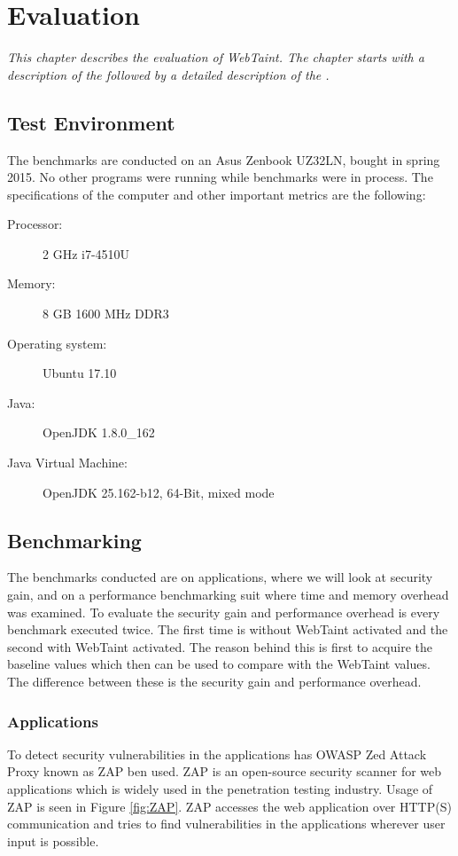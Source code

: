 \chapter{Evaluation}
\label{Evaluation}
\textit{This chapter describes the evaluation of WebTaint. The chapter starts with a description of the \textit{} followed by a detailed description of the \textit{}.}



\section{Test Environment}
\label{TestEnvironment}
The benchmarks are conducted on an Asus Zenbook UZ32LN, bought in spring 2015. No other programs were running while benchmarks were in process. The specifications of the computer and other important metrics are the following:

\begin{description}
    \item [Processor:] 2 GHz i7-4510U
    \item [Memory:] 8 GB 1600 MHz DDR3
    \item [Operating system:] Ubuntu 17.10
    \item [Java:] OpenJDK 1.8.0\_162
    \item [Java Virtual Machine:] OpenJDK 25.162-b12, 64-Bit, mixed mode
\end{description}



\section{Benchmarking}
\label{Benchmarking}
The benchmarks conducted are on applications, where we will look at security gain, and on a performance benchmarking suit where time and memory overhead was examined. To evaluate the security gain and performance overhead is every benchmark executed twice. The first time is without WebTaint activated and the second with WebTaint activated. The reason behind this is first to acquire the baseline values which then can be used to compare with the WebTaint values. The difference between these is the security gain and performance overhead.



\subsection{Applications}
To detect security vulnerabilities in the applications has OWASP Zed Attack Proxy \parencite{zap} known as ZAP ben used. ZAP is an open-source security scanner for web applications which is widely used in the penetration testing industry. Usage of ZAP is seen in Figure \ref{fig:ZAP}. ZAP accesses the web application over HTTP(S) communication and tries to find vulnerabilities in the applications wherever user input is possible.

